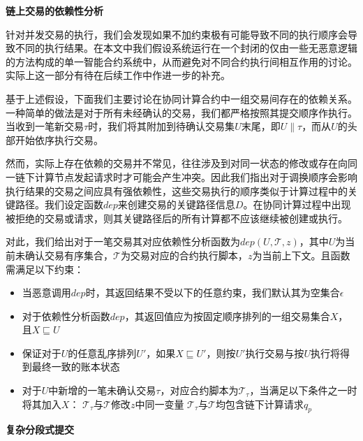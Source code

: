 \noindent\textbf{链上交易的依赖性分析}

针对并发交易的执行，我们会发现如果不加约束极有可能导致不同的执行顺序会导致不同的执行结果。在本文中我们假设系统运行在一个封闭的仅由一些无恶意逻辑的方法构成的单一智能合约系统中，从而避免对不同合约执行间相互作用的讨论。实际上这一部分有待在后续工作中作进一步的补充。

基于上述假设，下面我们主要讨论在协同计算合约中一组交易间存在的依赖关系。一种简单的做法是对于所有未经确认的交易，我们都严格按照其提交顺序作执行。当收到一笔新交易$\tau$时，我们将其附加到待确认交易集$U$末尾，即$U\parallel\tau$，而从$U$的头部开始依序执行交易。

然而，实际上存在依赖的交易并不常见，往往涉及到对同一状态的修改或存在向同一链下计算节点发起请求时才可能会产生冲突。因此我们指出对于调换顺序会影响执行结果的交易之间应具有强依赖性，这些交易执行的顺序类似于计算过程中的关键路径。我们设定函数$dep$来创建交易的关键路径信息$D$。在协同计算过程中出现被拒绝的交易或请求，则其关键路径后的所有计算都不应该继续被创建或执行。

对此，我们给出对于一笔交易其对应依赖性分析函数为$dep(U, \mathcal{T}, z)$，其中$U$为当前未确认交易有序集合，$\mathcal{T}$为交易对应的合约执行脚本，$z$为当前上下文。且函数需满足以下约束：
\begin{itemize}
\setlength{\itemsep}{0pt}
\setlength{\parsep}{0pt}
\setlength{\parskip}{0pt}
    \item 当恶意调用$dep$时，其返回结果不受以下的任意约束，我们默认其为空集合$\epsilon$
    \item 对于依赖性分析函数$dep$，其返回值应为按固定顺序排列的一组交易集合$X$，且$X \sqsubseteq U$
    \item 保证对于$U$的任意乱序排列$U'$，如果$X \sqsubseteq U'$，则按$U'$执行交易与按$U$执行将得到最终一致的账本状态
    \item 对于$U$中新增的一笔未确认交易$\tau$，对应合约脚本为$\mathcal{T}_\tau$，当满足以下条件之一时将其加入$X$：
    \subitem $\mathcal{T}_\tau$与$\mathcal{T}$修改$z$中同一变量
    \subitem $\mathcal{T}_\tau$与$\mathcal{T}$均包含链下计算请求$q_p$
\end{itemize}

\noindent\textbf{复杂分段式提交}


